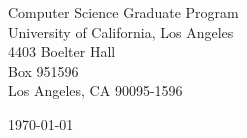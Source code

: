 \begin{minipage}{0.49\textwidth}
\begin{flushleft}
\noindent
Computer Science Graduate Program\\
University of California, Los Angeles\\
4403 Boelter Hall\\
Box 951596\\
Los Angeles, CA 90095-1596
\end{flushleft}
\end{minipage}
\begin{minipage}{0.47\textwidth}
\begin{flushright}
\today
\end{flushright}
\end{minipage} \\

\newcommand{\univ}{University of California, Los Angeles}
\newcommand{\univshort}{UCLA}
\newcommand{\degree}{M.Sc.}
\newcommand{\dept}{Computer Science}
